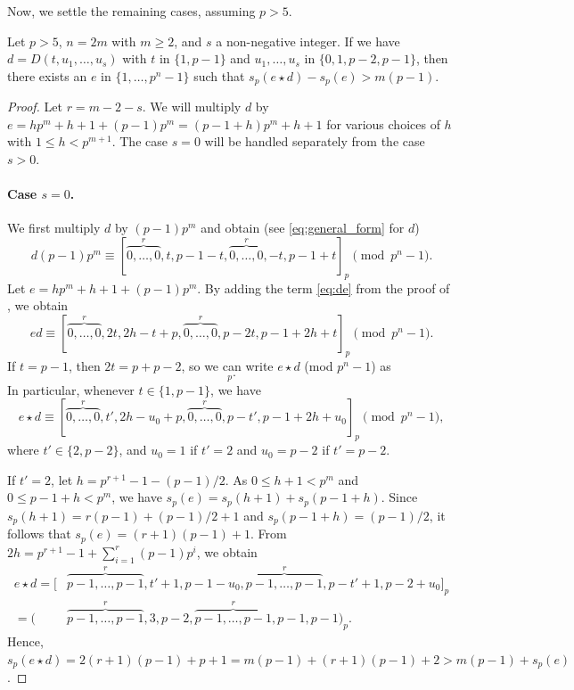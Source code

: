 \documentclass[12pt]{article}
\newcommand{\wt}{s_p}
\begin{document}
Now, we settle the remaining cases, assuming $p> 5$.
\begin{lemma}
\label{lem:remaining_p7}
Let $p>5$, $n = 2m$ with $m \geq 2$, and $s$ a non-negative integer. If we have $d = D(t,u_1,\dots,u_s)$ with $t$ in $\{1,p-1\}$ and $u_1,\ldots,u_s$ in $\{0,1,p-2,p-1\}$, then there exists an $e$ in $\{1,\dots,p^n-1\}$ such that $\wt(e \star d) - \wt(e) > m(p-1)$.
\end{lemma}
\begin{proof}
Let $r = m - 2 - s$.
We will multiply $d$ by $e = hp^m + h+1 + (p-1)p^m = (p-1+h)p^m + h+1$ for various choices of $h$ with $1 \leq h < p^{m+1}$.
The case $s = 0$ will be handled separately from the case $s > 0$.

\paragraph{Case $s=0$.} 
We first multiply $d$ by $(p-1)p^m$ and obtain (see \eqref{eq:general_form} for $d$)
\begin{equation*}
d (p-1)p^m \equiv [\overbrace{0,\dots,0}^r,t,p-1-t,\overbrace{0,\dots,0}^r,-t,p-1+t]_p \pmod{p^n-1}.
\end{equation*}
Let $e = hp^m + h+1 + (p-1)p^m$. By adding the term \eqref{eq:de} from the proof of , we obtain 
\begin{equation*}
    ed \equiv [\overbrace{0,\dots,0}^r,2t, 2h-t+p,\overbrace{0,\dots,0}^r,p-2t, p-1+2h+t]_p \pmod{p^n-1}.
\end{equation*}
If $t = p-1$, then $2t = p + p-2$, so we can write $e \star d$ (mod $p^n-1$) as
\begin{equation*}
    [\overbrace{0,\dots,0}^r,p-2, 2h+2,\overbrace{0,\dots,0}^r,2, p-2+2h+p-1]_p.
\end{equation*}
In particular, whenever $t \in \{1,p-1\}$, we have
\begin{equation*}
    e \star d \equiv [\overbrace{0,\dots,0}^r,t', 2h-u_0+p,\overbrace{0,\dots,0}^r,p-t', p-1+2h+u_0]_p \pmod {p^n-1},
\end{equation*}
where $t' \in \{2,p-2\}$, and $u_0 = 1$ if $t' = 2$ and $u_0 = p - 2$ if $t' = p - 2$.

If $t' = 2$, let $h = p^{r + 1} - 1 - (p - 1)/2$. As $0 \leq h+1 <p^m$ and $0 \leq p-1+h <p^m$, we have $\wt(e) = \wt(h+1) + \wt(p-1+h)$. Since $\wt(h + 1) = r(p-1) + (p - 1)/2 + 1$ and $\wt(p - 1+ h) =  (p - 1)/2$, it follows that $\wt(e) = (r + 1)(p - 1) + 1$.
From $2h = p^{r + 1} - 1 + \sum_{i = 1}^r (p - 1)p^i$, we obtain
\begin{align*}
e \star d = [&\overbrace{p-1,\dots,p-1}^r,t'+1, p-1-u_0,\overbrace{p-1,\dots,p-1}^r,p-t'+1, p-2+u_0]_p \\
= (&\overbrace{p-1,\dots,p-1}^r,3, p-2,\overbrace{p-1,\dots,p-1}^r,p-1, p-1)_p.
\end{align*}
Hence, $\wt(e \star d) = 2(r+1)(p-1) + p+1 = m(p-1) + (r+1)(p-1) + 2 > m(p - 1) + \wt(e)$.


\end{proof}
\end{document}
